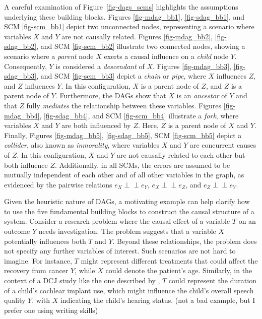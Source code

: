 \documentclass[
  authoryear,
  preprint,
  1p]{elsarticle}
\begin{document}
A careful examination of Figure~\ref{fig-dags_scms} highlights the
assumptions underlying these building blocks. Figures
\ref{fig-mdag_bb1}, \ref{fig-sdag_bb1}, and SCM \ref{fig-scm_bb1} depict
two unconnected nodes, representing a scenario where variables \(X\) and
\(Y\) are not causally related. Figures \ref{fig-mdag_bb2},
\ref{fig-sdag_bb2}, and SCM \ref{fig-scm_bb2} illustrate two connected
nodes, showing a scenario where a \emph{parent} node \(X\) exerts a
causal influence on a \emph{child} node \(Y\). Consequently, \(Y\) is
considered a \emph{descendant} of \(X\). Figures \ref{fig-mdag_bb3},
\ref{fig-sdag_bb3}, and SCM \ref{fig-scm_bb3} depict a \emph{chain} or
\emph{pipe}, where \(X\) influences \(Z\), and \(Z\) influences \(Y\).
In this configuration, \(X\) is a parent node of \(Z\), and \(Z\) is a
parent node of \(Y\). Furthermore, the DAGs show that \(X\) is an
\emph{ancestor} of \(Y\) and that \(Z\) fully \emph{mediates} the
relationship between these variables. Figures \ref{fig-mdag_bb4},
\ref{fig-sdag_bb4}, and SCM \ref{fig-scm_bb4} illustrate a \emph{fork},
where variables \(X\) and \(Y\) are both influenced by \(Z\). Here,
\(Z\) is a parent node of \(X\) and \(Y\). Finally, Figures
\ref{fig-mdag_bb5}, \ref{fig-sdag_bb5}, SCM \ref{fig-scm_bb5} depict a
\emph{collider}, also known as \emph{inmorality}, where variables \(X\)
and \(Y\) are concurrent causes of \(Z\). In this configuration, \(X\)
and \(Y\) are not causally related to each other but both influence
\(Z\). Additionally, in all SCMs, the errors are assumed to be mutually
independent of each other and of all other variables in the graph, as
evidenced by the pairwise relations \(e_{X} \perp\!\!\!\perp e_{Y}\),
\(e_{X} \perp\!\!\!\perp e_{Z}\), and \(e_{Z} \perp\!\!\!\perp e_{Y}\).

Given the heuristic nature of DAGs, a motivating example can help
clarify how to use the five fundamental building blocks to construct the
causal structure of a system. Consider a research problem where the
causal effect of a variable \(T\) on an outcome \(Y\) needs
investigation. The problem suggests that a variable \(X\) potentially
influences both \(T\) and \(Y\). Beyond these relationships, the problem
does not specify any further variables of interest. Such scenarios are
not hard to imagine. For instance, \(T\) might represent different
treatments that could affect the recovery from cancer \(Y\), while \(X\)
could denote the patient's age. Similarly, in the context of a DCJ study
like the one described by \citet{Boonen_et_al_2020}, \(T\) could
represent the duration of a child's cochlear implant use, which might
influence the child's overall speech quality \(Y\), with \(X\)
indicating the child's hearing status. {(not a bad example, but I prefer
one using writing skills)}
\end{document}
